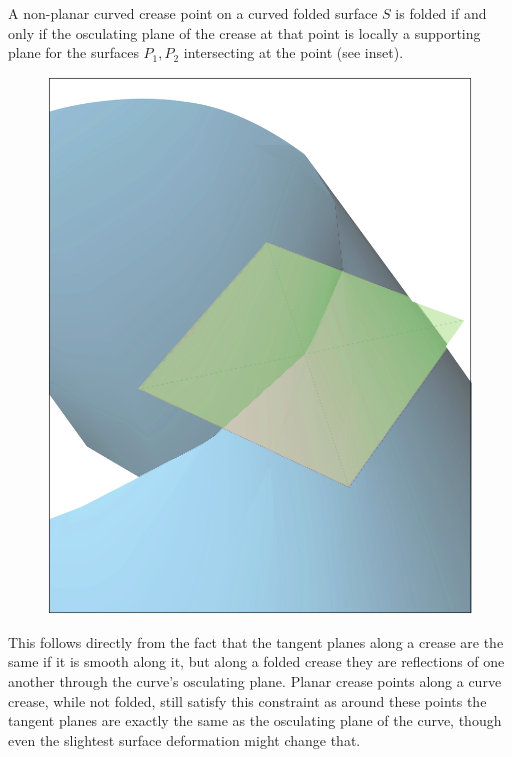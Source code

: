 \begin{theorem}\label{Thm:supporting_plane}
A non-planar curved crease point on a curved folded surface $S$ is folded if and only if the osculating plane of the crease at that point is locally a supporting plane for the surfaces $P_1,P_2$ intersecting at the point (see inset).
\end{theorem}
\setlength{\columnsep}{8pt}%
\begin{figure}
  \centering
  \includegraphics[width=\linewidth]{figures/plane_side}
\end{figure}
This follows directly from the fact that the tangent planes along a crease are the same if it is smooth along it, but along a folded crease they are reflections of one another through the curve's osculating plane. Planar crease points along a curve crease, while not folded, still satisfy this constraint as around these points the tangent planes are exactly the same as the osculating plane of the curve, though even the slightest surface deformation might change that. 


